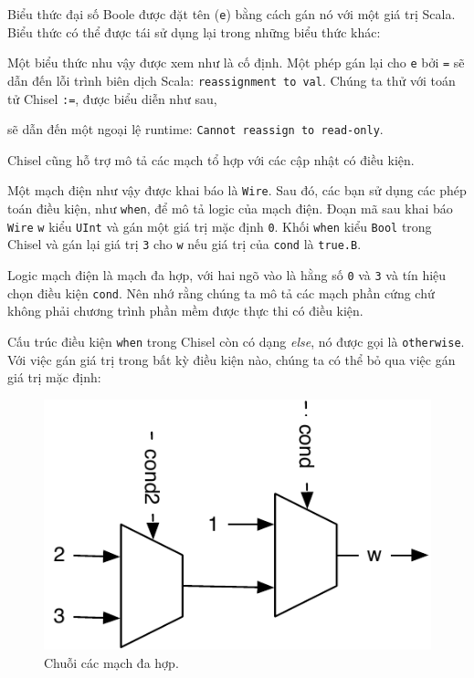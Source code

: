 \documentclass[%
    10pt,
    headinclude, footexclude,
    openright, %
    notitlepage,
    cleardoubleempty,
    headsepline,
    pointlessnumbers,
    bibtotoc, idxtotoc,
    ]{scrbook}
\newcommand{\code}[1]{{\small{\texttt{#1}}}}
\newcommand{\scale}{0.7}
\begin{document}

\noindent Biểu thức đại số Boole được đặt tên (\code{e}) bằng cách gán nó
với một giá trị Scala. Biểu thức có thể được tái sử dụng lại trong những biểu thức khác:


Một biểu thức nhu vậy được xem như là cố định. Một phép gán lại cho \code{e}
bởi \code{=} sẽ dẫn đến lỗi trình biên dịch Scala: \code{reassignment to val}.
Chúng ta thử với toán tử Chisel \code{:=}, được biểu diễn như sau,


\noindent sẽ dẫn đến một ngoại lệ runtime: \code{Cannot reassign to read-only}.

Chisel cũng hỗ trợ mô tả các mạch tổ hợp với các cập nhật có điều kiện.

Một mạch điện như vậy được khai báo là \code{Wire}. Sau đó, các bạn sử dụng các phép toán điều kiện,
như \code{when}, để mô tả logic của mạch điện.
Đoạn mã sau khai báo \code{Wire} \code{w} kiểu \code{UInt} và gán một giá trị mặc định 
\code{0}. Khối \code{when} kiểu \code{Bool} trong Chisel và gán lại giá trị
\code{3} cho \code{w} nếu giá trị của \code{cond} là \code{true.B}.


\noindent Logic mạch điện là mạch đa hợp, với hai ngõ vào là hằng số
\code{0} và \code{3} và tín hiệu chọn điều kiện \code{cond}.
Nên nhớ rằng chúng ta mô tả các mạch phần cứng chứ không phải chương trình phần mềm được thực thi có điều  kiện.

Cấu trúc điều kiện \code{when} trong Chisel còn có dạng \emph{else}, nó được gọi là
\code{otherwise}. Với việc gán giá trị trong bất kỳ điều kiện nào, chúng ta có thể bỏ qua việc gán giá trị mặc định:



\begin{figure}
  \centering
  \includegraphics[scale=\scale]{figures/mux-chain}
  \caption{Chuỗi các mạch đa hợp.}
  \label{fig:mux-chain}
\end{figure}
\end{document}
